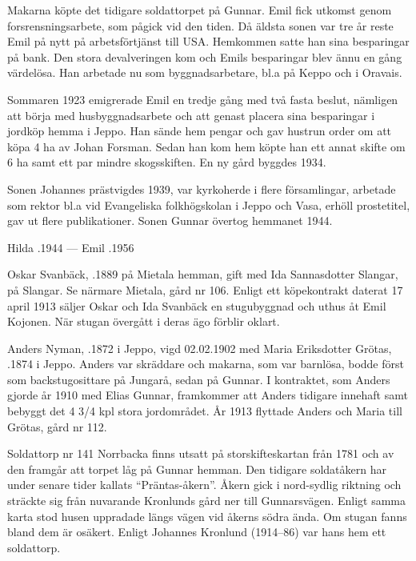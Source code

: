 Makarna köpte det tidigare soldattorpet på Gunnar. Emil fick utkomst genom forsrensningsarbete, som pågick vid den tiden. Då äldsta sonen var tre år reste Emil på nytt på arbetsförtjänst till USA. Hemkommen satte han sina besparingar på bank. Den stora devalveringen kom och Emils besparingar blev ännu en gång värdelösa. Han arbetade nu som byggnadsarbetare, bl.a på Keppo och i Oravais.

Sommaren 1923 emigrerade Emil en tredje gång med två fasta beslut, nämligen att börja med husbyggnadsarbete och att genast placera sina besparingar i jordköp hemma i Jeppo. Han sände hem pengar och gav hustrun order om att köpa 4 ha av Johan Forsman. Sedan han kom hem köpte han ett annat skifte om 6 ha samt ett par mindre skogsskiften. En ny gård byggdes 1934.

Sonen Johannes prästvigdes 1939, var kyrkoherde i flere församlingar, arbetade som rektor bl.a vid  Evangeliska folkhögskolan i Jeppo och Vasa, erhöll prostetitel, gav ut flere publikationer. Sonen Gunnar övertog hemmanet 1944.

Hilda .1944  ---  Emil .1956


Oskar Svanbäck, .1889 på Mietala hemman, gift med Ida Sannasdotter Slangar,  på Slangar. Se närmare Mietala, gård nr 106. Enligt ett köpekontrakt daterat 17 april 1913 säljer Oskar och Ida Svanbäck en stugubyggnad och uthus åt Emil Kojonen. När stugan övergått i deras ägo förblir oklart.


Anders Nyman, .1872 i Jeppo, vigd 02.02.1902 med Maria Eriksdotter Grötas, .1874 i Jeppo. Anders var skräddare och makarna, som var barnlösa, bodde först som backstugosittare på Jungarå, sedan på Gunnar. I kontraktet, som Anders gjorde år 1910 med Elias Gunnar, framkommer att Anders tidigare innehaft samt bebyggt det 4 3/4 kpl stora jordområdet. År 1913 flyttade Anders och Maria till Grötas, gård nr 112.


Soldattorp nr 141 Norrbacka finns utsatt på storskifteskartan från 1781 och av den framgår att torpet låg på Gunnar hemman. Den tidigare soldatåkern har under senare tider kallats ``Präntas-åkern''. Åkern gick i nord-sydlig riktning och sträckte sig från nuvarande Kronlunds gård ner till Gunnarsvägen. Enligt samma karta stod husen uppradade längs vägen vid åkerns södra ända. Om stugan fanns bland dem är osäkert. Enligt Johannes Kronlund (1914--86) var hans hem ett soldattorp.

